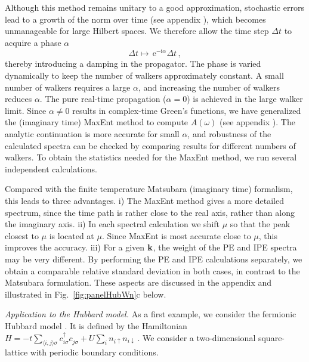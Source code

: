 \documentclass[aps,prl,twocolumn,showpacs,superscriptaddress,floatfix]{revtex4-1}
\begin{document}
Although this method remains unitary to a good approximation, 
stochastic errors lead to a growth of the norm over time
(see appendix \cite{supplement}), which becomes 
unmanageable for large Hilbert spaces.
We therefore allow the time step $\Delta t$ to acquire a phase $\alpha$ 
\begin{equation}
\Delta t \mapsto \,\mathrm{e}^{-\mathrm{i}\alpha}\Delta t\,,
\end{equation}
thereby introducing a damping in the propagator. The phase is varied
dynamically to keep the number of walkers approximately constant. 
A small number of walkers requires a large $\alpha$, and increasing the 
number of walkers reduces $\alpha$. The pure real-time propagation  
($\alpha=0$) is achieved in the large walker limit. Since $\alpha\ne 0$ 
results in complex-time Green's functions,  we have generalized the 
(imaginary time) MaxEnt method \cite{maxent,Jarrell} to compute $A(\omega)$ 
(see appendix \cite{supplement}). The analytic continuation is 
more accurate for small $\alpha$, and robustness of the calculated spectra can be 
checked by comparing results for different numbers of walkers. To obtain 
the statistics needed for the MaxEnt method, we run several independent calculations.

Compared with the finite temperature Matsubara (imaginary time) formalism, 
this leads to three advantages. i) The MaxEnt method gives a more
detailed spectrum, since the time path is rather close to the real axis,
rather than along the imaginary axis. ii) In each spectral calculation we shift $\mu$ so that the peak closest to $\mu$ is located at $\mu$. Since MaxEnt  is most accurate close to
$\mu$, this improves the accuracy. iii) For a given ${\bf k}$, the weight of the 
PE and IPE spectra may be very different. By performing the PE and IPE
calculations separately, we obtain a comparable relative standard deviation 
in both cases, in contrast to the Matsubara formulation. These aspects are 
discussed in the appendix \cite{supplement} and illustrated in
Fig.~\ref{fig:panelHubWn}c below. 



{\it Application to the Hubbard model.}
As a first example, we consider the fermionic Hubbard model \cite{Hubbard}. It is defined by the Hamiltonian 
$               
  H = -t\sum_{\langle i,j\rangle \sigma}         c^{\dagger}_{i\sigma} c^{}_{j \sigma} + U \sum_i
  n_{i\uparrow} n_{i\downarrow} \,.
$
We consider a two-dimensional square-lattice with periodic boundary conditions.  
\end{document}
